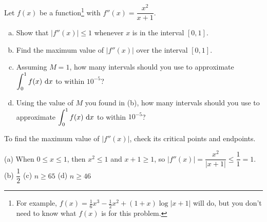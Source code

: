 \begin{question}\label{prob_s1.11_exactM}
Let $f(x)$ be a function\footnote{For example, $f(x)=\frac{1}{6}x^3-\frac{1}{2}x^2+(1+x)\log|x+1|$ will do, but you don't need to know what $f(x)$ is for this problem.} with $f''(x) = \dfrac{x^2}{x+1}$.

\begin{enumerate}[(a)]
\item Show that $|f''(x)| \leq 1$ whenever $x$ is in the interval $[0,1]$.
\item Find the maximum value of $|f''(x)|$ over the interval $[0,1]$.
\item Assuming $M=1$, how many intervals should you use to approximate $\displaystyle\int_{0}^{1}f(x)~\mathrm{d}x$ to within $10^{-5}$?
\item Using the value of  $M$ you found in (b), how many intervals should you use to approximate $\displaystyle\int_0^1 f(x)~\mathrm{d}x$ to within $10^{-5}$?\end{enumerate}

\end{question}
\begin{hint}
To find the maximum value of $|f''(x)|$, check its critical points and endpoints.
\end{hint}
\begin{answer}
(a) When $0 \leq x \leq1$, then $x^2 \leq 1$ and $x+1 \geq 1$, so $|f''(x)| = \dfrac{x^2}{|x+1|}\leq \dfrac{1}{1}=1$.\\
(b) $\dfrac{1}{2}$\qquad
(c) $n \geq 65$\qquad
(d) $n \geq 46$
\end{answer}
